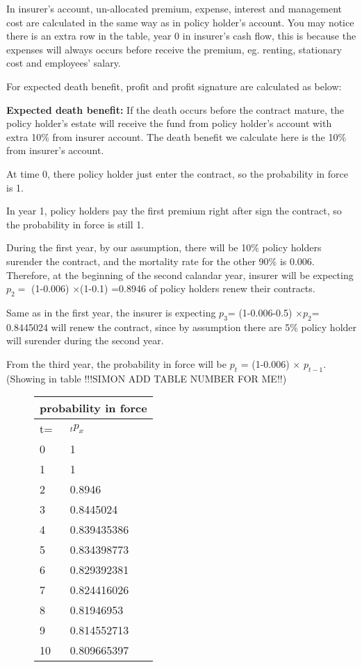 \documentclass{report}
\begin{document}
In insurer's account, un-allocated premium, expense, interest and management cost are calculated in the same way as in policy holder's account. You may notice there is an extra row in the table, year 0 in insurer's cash flow, this is because the expenses will always occurs before receive the premium, eg. renting, stationary cost and employees' salary. 

For expected death benefit, profit and profit signature are calculated as below:

\textbf{Expected death benefit:} If the death occurs before the contract mature, the policy holder's estate will receive the fund from policy holder's account with extra 10\% from insurer account. The death benefit we calculate here is the 10\% from insurer's account. 

At time 0, there policy holder just enter the contract, so the probability in force is 1.

In year 1, policy holders pay the first premium right after sign the contract, so the probability in force is still 1. 

During the first year, by our assumption, there will be 10\% policy holders surender the contract, and the mortality rate for the other 90\% is 0.006. Therefore, at the beginning of the second calandar year, insurer will be expecting $p_2=$ (1-0.006) $\times$(1-0.1) =0.8946 of policy holders renew their contracts. 

Same as in the first year, the insurer is expecting $p_3$= (1-0.006-0.5) $\times$$p_2$= 0.8445024 will renew the contract, since by assumption there are 5\% policy holder will surender during the second year.

From the third year, the probability in force will be $p_t$ = (1-0.006) $\times$ $p_{t-1}$. (Showing in table !!!SIMON ADD TABLE NUMBER FOR ME!!)


\begin{figure}[H]
\begin{tabular}{|l|l|}
  \hline
  \multicolumn{2}{|c|}{probability in force} \\
  \hline
t=	& $_t p_x$\\
\hline
0	&1\\
1	&1\\
2	&0.8946\\
3	&0.8445024\\
4	&0.839435386\\
5	&0.834398773\\
6	&0.829392381\\
7	&0.824416026\\
8	&0.81946953\\
9	&0.814552713\\
10	&0.809665397\\
  \hline
\end{tabular}
\end{figure}
\end{document}
